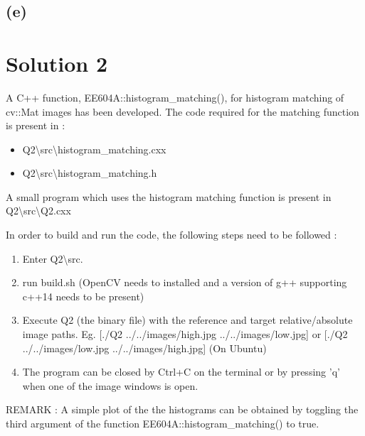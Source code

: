 \documentclass[a4paper,fleqn,11pt]{article}
\theoremstyle{mytheor}
\begin{document}
\subsection*{(e)}

\section*{Solution 2}

A C++ function, EE604A::histogram\_matching(), for histogram matching of cv::Mat images has been developed.
The code required for the matching function is present in :
\begin{itemize}
\item Q2\textbackslash src\textbackslash histogram\_matching.cxx
\item Q2\textbackslash src\textbackslash histogram\_matching.h 
\end{itemize}
A small program which uses the histogram matching function is present in Q2\textbackslash src\textbackslash Q2.cxx

In order to build and run the code, the following steps need to be followed :
\begin{enumerate}
\item Enter Q2\textbackslash src.
\item run build.sh (OpenCV needs to installed and a version of g++ supporting c++14 needs to be present)
\item Execute Q2 (the binary file) with the reference and target relative/absolute image paths. Eg. [./Q2 ../../images/high.jpg ../../images/low.jpg] or [./Q2 ../../images/low.jpg ../../images/high.jpg] (On Ubuntu)
\item The program can be closed by Ctrl+C on the terminal or by pressing 'q' when one of the image windows is open.
\end{enumerate}
REMARK : A simple plot of the the histograms can be obtained by toggling the third argument of the function EE604A::histogram\_matching() to true.
\end{document}
